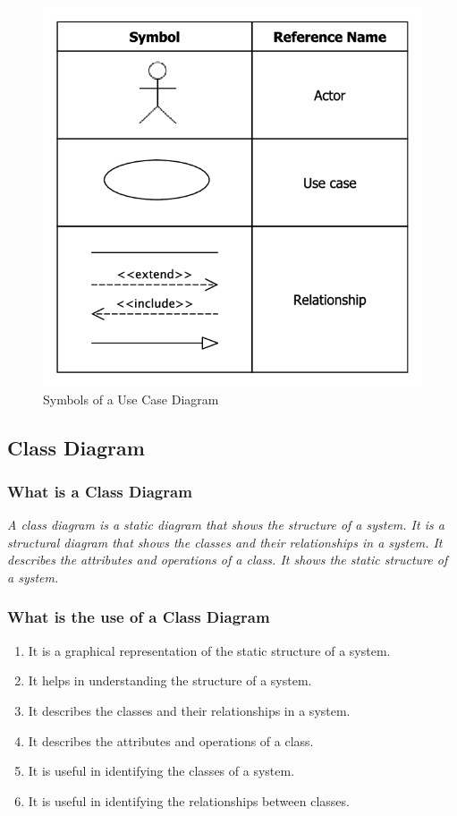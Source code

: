 \documentclass[11pt]{article}
\begin{document}
\begin{figure}[H]
	\centering
	\includegraphics[scale=0.35]{Symbols-of-use-case-diagrams.png}
	\caption{Symbols of a Use Case Diagram}
\end{figure}

\subsection{Class Diagram}

\subsubsection{What is a Class Diagram}

\textit{A class diagram is a static diagram that shows the structure of a system. It is a structural diagram that shows the classes and their relationships in a system. It describes the attributes and operations of a class. It shows the static structure of a system.}

\subsubsection{What is the use of a Class Diagram}

\begin{enumerate}
	\item It is a graphical representation of the static structure of a system.
	\item It helps in understanding the structure of a system.
	\item It describes the classes and their relationships in a system.
	\item It describes the attributes and operations of a class.
	\item It is useful in identifying the classes of a system.
	\item It is useful in identifying the relationships between classes.
\end{enumerate}
\end{document}
